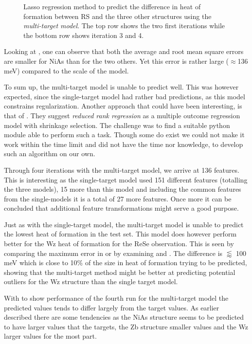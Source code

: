 \begin{figure}[ht]
    
    
    \caption[Predicted versus target values scatter plot of the multi-target model]{Lasso regression method to predict the difference in heat of formation between RS and the three other structures using the \emph{multi-target model}. The top row shows the two first iterations while the bottom row shows iteration 3 and 4.}
    \label{fig:multi_scatter}
\end{figure}


Looking at , one can observe that both the average and root mean square errors are smaller for NiAs than for the two others. Yet this error is rather large ($\approx$136 meV) compared to the scale of the model. 

To sum up, the multi-target model is unable to predict well. This was however expected, since the single-target model had rather bad predictions, as this model constrains regularization. 
Another approach that could have been interesting, is that of \citep{Tibshirani_Hastie_Friedman}. They suggest \emph{reduced rank regression} as a multiple outcome regression model with shrinkage selection. The challenge was to find a suitable python module able to perform such a task. Though some do exist we could not make it work within the time limit and did not have the time nor knowledge, to develop such an algorithm on our own. 

Through four iterations with the multi-target model, we arrive at 136 features. This is interesting as the single-target model used 151 different features (totalling the three models), 15 more than this model and including the common features from the single-models it is a total of 27 more features. Once more it can be concluded that additional feature transformations might serve a good purpose.

Just as with the single-target model, the multi-target model is unable to predict the lowest heat of formation in the test set. This model does however perform better for the Wz heat of formation for the ReSe observation. This is seen by comparing the maximum error in  or by examining  and . The difference is $\lessapprox $ 100 meV which is close to 10\% of the size in heat of formation trying to be predicted, showing that the multi-target method might be better at predicting potential outliers for the Wz structure than the single target model.

With  to show performance of the fourth run for the multi-target model the predicted values tends to differ largely from the target values. As earlier described there are some tendencies as the NiAs structure seems to be predicted to have larger values that the targets, the Zb structure smaller values and the Wz larger values for the most part. 

